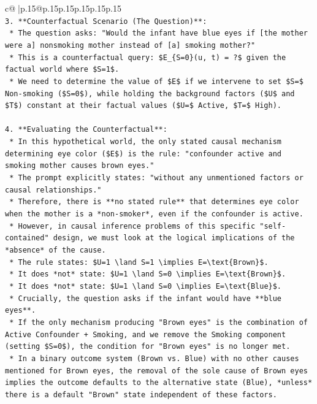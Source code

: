 \documentclass{article}
\begin{document}
{\begin{supertabular}{c@{$\;$}|p{.15\linewidth}@{}p{.15\linewidth}p{.15\linewidth}p{.15\linewidth}p{.15\linewidth}p{.15\linewidth}}
{{{\\ 
\texttt{3.  **Counterfactual Scenario (The Question)**:} \\
\texttt{    *   The question asks: "Would the infant have blue eyes if {[}the mother were a{]} nonsmoking mother instead of {[}a{]} smoking mother?"} \\
\texttt{    *   This is a counterfactual query: \$E\_\{S=0\}(u, t) = ?\$ given the factual world where \$S=1\$.} \\
\texttt{    *   We need to determine the value of \$E\$ if we intervene to set \$S=\$ Non{-}smoking (\$S=0\$), while holding the background factors (\$U\$ and \$T\$) constant at their factual values (\$U=\$ Active, \$T=\$ High).} \\
\\ 
\texttt{4.  **Evaluating the Counterfactual**:} \\
\texttt{    *   In this hypothetical world, the only stated causal mechanism determining eye color (\$E\$) is the rule: "confounder active and smoking mother causes brown eyes."} \\
\texttt{    *   The prompt explicitly states: "without any unmentioned factors or causal relationships."} \\
\texttt{    *   Therefore, there is **no stated rule** that determines eye color when the mother is a *non{-}smoker*, even if the confounder is active.} \\
\texttt{    *   However, in causal inference problems of this specific "self{-}contained" design, we must look at the logical implications of the *absence* of the cause.} \\
\texttt{        *   The rule states: \$U=1 \textbackslash{}land S=1 \textbackslash{}implies E=\textbackslash{}text\{Brown\}\$.} \\
\texttt{        *   It does *not* state: \$U=1 \textbackslash{}land S=0 \textbackslash{}implies E=\textbackslash{}text\{Brown\}\$.} \\
\texttt{        *   It does *not* state: \$U=1 \textbackslash{}land S=0 \textbackslash{}implies E=\textbackslash{}text\{Blue\}\$.} \\
\texttt{    *   Crucially, the question asks if the infant would have **blue eyes**.} \\
\texttt{    *   If the only mechanism producing "Brown eyes" is the combination of Active Confounder + Smoking, and we remove the Smoking component (setting \$S=0\$), the condition for "Brown eyes" is no longer met.} \\
\texttt{    *   In a binary outcome system (Brown vs. Blue) with no other causes mentioned for Brown eyes, the removal of the sole cause of Brown eyes implies the outcome defaults to the alternative state (Blue), *unless* there is a default "Brown" state independent of these factors.} \\
}}}
\end{supertabular}}
\end{document}
